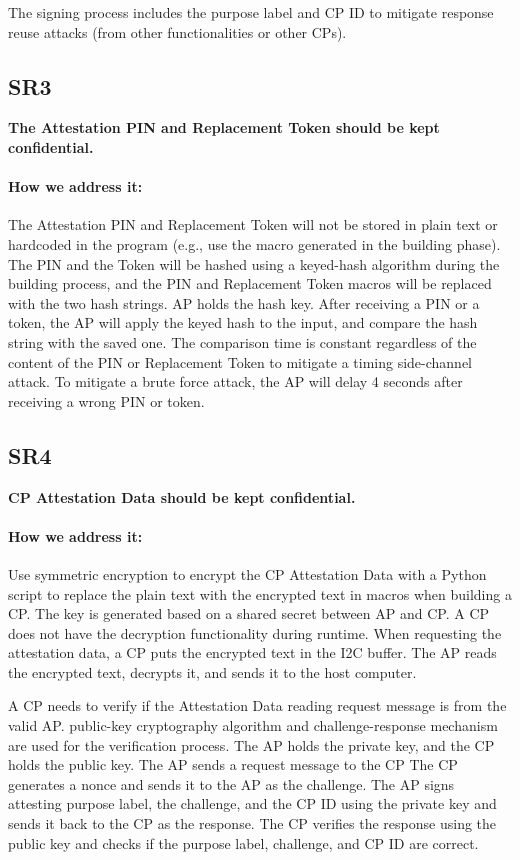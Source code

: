 \documentclass[11pt,oneside,onecolumn,letterpaper]{article}
\newcounter{alg}
\begin{document}
	The signing process includes the purpose label and CP ID to mitigate response reuse attacks (from other functionalities or other CPs).
	
	\subsection{SR3}
	\textbf{The Attestation PIN and Replacement Token should be kept confidential.}
	\paragraph{How we address it:}
	The Attestation PIN and Replacement Token will not be stored in plain text or hardcoded in the program (e.g., use the macro generated in the building phase).
	The PIN and the Token will be hashed using a keyed-hash algorithm during the building process,
	and the PIN and Replacement Token macros will be replaced with the two hash strings.
	AP holds the hash key.
	After receiving a PIN or a token,
	the AP will apply the keyed hash to the input,
	and compare the hash string with the saved one.
	The comparison time is constant regardless of the content of the PIN or Replacement Token to mitigate a timing side-channel attack.
	To mitigate a brute force attack,
	the AP will delay 4 seconds after receiving a wrong PIN or token.
	
	\subsection{SR4}
	\textbf{CP Attestation Data should be kept confidential.}
	\paragraph{How we address it:}
	Use symmetric encryption to encrypt the CP Attestation Data with a Python script to replace the plain text with the encrypted text in macros when building a CP.
	The key is generated based on a shared secret between AP and CP.
	A CP does not have the decryption functionality during runtime.
	When requesting the attestation data,
	a CP puts the encrypted text in the I2C buffer.
	The AP reads the encrypted text,
	decrypts it,
	and sends it to the host computer.
	
	A CP needs to verify if the Attestation Data reading request message is from the valid AP.
	public-key cryptography algorithm and challenge-response mechanism are used for the verification process.
	The AP holds the private key,
	and the CP holds the public key.
	The AP sends a request message to the CP
	The CP generates a nonce and sends it to the AP as the challenge.
	The AP signs attesting purpose label,
	the challenge,
	and the CP ID using the private key and sends it back to the CP as the response.
	The CP verifies the response using the public key and checks if the purpose label,
	challenge,
	and CP ID are correct.
	
\end{document}

